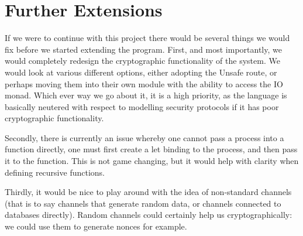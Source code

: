 \section{Further Extensions}
\label{sec:extension}
If we were to continue with this project there would be several things we would fix before we started extending the program. 
First, and most importantly, we would completely redesign the cryptographic functionality of the system. We would look at various different options, either adopting the Unsafe route, or perhaps moving them into their own module with the ability to access the IO monad. Which ever way we go about it, it is a high priority, as the language is basically neutered with respect to modelling security protocols if it has poor cryptographic functionality.

Secondly, there is currently an issue whereby one cannot pass a process into a function directly, one must first create a let binding to the process, and then pass it to the function. This is not game changing, but it would help with clarity when defining recursive functions.

Thirdly, it would be nice to play around with the idea of non-standard channels (that is to say channels that generate random data, or channels connected to databases directly). Random channels could certainly help us cryptographically: we could use them to generate nonces for example.
